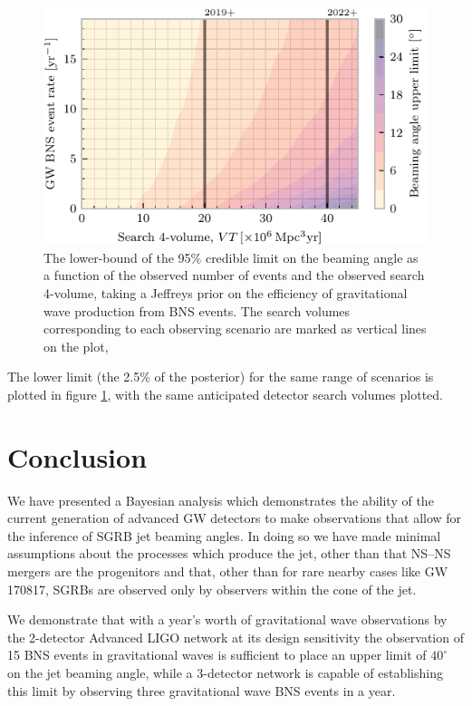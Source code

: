 \documentclass[twocolumn,nofootinbib]{revtex4-1}
\newcommand{\BNS}{\ac{NS}--\ac{NS}\xspace}
\begin{document}
\begin{figure}
\centering
\includegraphics[width=\linewidth]{volume_v_nevents_lower.pdf}
\caption{\label{fig:volumevevents_lower} The lower-bound of the 95\%
  credible limit on the beaming angle as a function of the observed
  number of events and the observed search 4-volume, taking a Jeffreys
  prior on the efficiency of gravitational wave production from BNS
  events. The search volumes corresponding to each observing scenario
  are marked as vertical lines on the plot, }
\end{figure}

The lower limit (the 2.5\% of the posterior) for the same range of
scenarios is plotted in figure \ref{fig:volumevevents_lower}, with the
same anticipated detector search volumes plotted.

\section{Conclusion}

We have presented a Bayesian analysis which demonstrates the ability
of the current generation of advanced \ac{GW} detectors to make observations
that allow for the inference of \ac{SGRB} jet beaming angles. In doing so we
have made minimal assumptions about the processes which produce the jet, other
than that \BNS mergers are the progenitors and that, other than for rare nearby
cases like GW 170817, \acp{SGRB} are observed only by observers within the cone
of the jet.

We demonstrate that with a year's worth of gravitational wave
observations by the 2-detector Advanced LIGO network at its design
sensitivity the observation of 15 BNS events in gravitational waves is
sufficient to place an upper limit of $40^{\circ}$ on the jet beaming
angle, while a 3-detector network is capable of establishing this
limit by observing three gravitational wave BNS events in a year.
\end{document}
